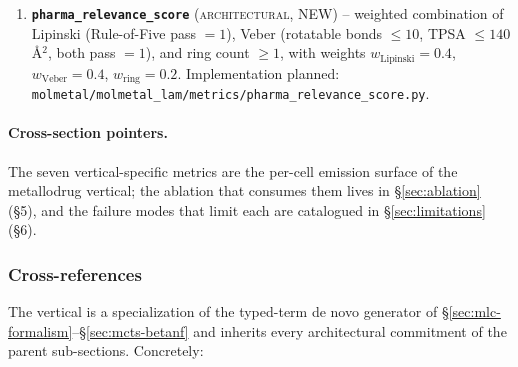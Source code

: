 \begin{enumerate}
  \item \textbf{\texttt{pharma\_relevance\_score}}
        (\textsc{architectural}, NEW) -- weighted combination
        of Lipinski (Rule-of-Five pass $= 1$),
        Veber (rotatable bonds $\leq 10$, TPSA $\leq 140$
        \AA$^2$, both pass $=1$), and ring count $\geq 1$,
        with weights $w_\text{Lipinski} = 0.4$, $w_\text{Veber}
        = 0.4$, $w_\text{ring} = 0.2$. Implementation planned:
        \texttt{molmetal/molmetal\_lam/metrics/pharma\_relevance\_score.py}.
\end{enumerate}

\paragraph{Cross-section pointers.}
The seven vertical-specific metrics are the per-cell
emission surface of the metallodrug vertical; the
ablation that consumes them lives in \S\ref{sec:ablation}
(\S5), and the failure modes that limit each are catalogued
in \S\ref{sec:limitations} (\S6).

\subsubsection{Cross-references}
\label{sec:metallodrug-vertical-cross-refs}

The vertical is a specialization of the typed-term de novo
generator of \S\ref{sec:mlc-formalism}--\S\ref{sec:mcts-betanf}
and inherits every architectural commitment of the parent
sub-sections. Concretely:

